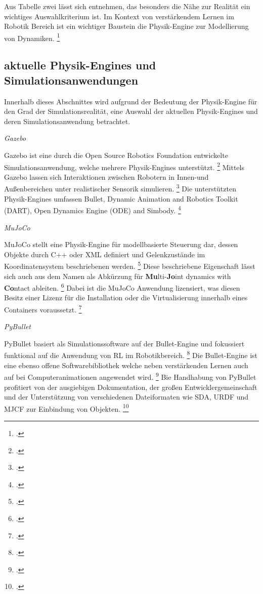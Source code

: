Aus Tabelle zwei lässt sich entnehmen, das besonders die Nähe zur Realität ein wichtiges Auswahlkriterium ist.
Im Kontext von verstärkendem Lernen im Robotik Bereich ist ein wichtiger Baustein die Physik-Engine zur Modellierung von Dynamiken. \footcite[Vgl.][S. 2]{Ayala.2020}

\subsection{aktuelle Physik-Engines und Simulationsanwendungen}
Innerhalb dieses Abschnittes wird aufgrund der Bedeutung der Physik-Engine für den Grad der Simulationsrealität, eine Auswahl der aktuellen Physik-Engines und deren Simulationsanwendung betrachtet.

\textit{Gazebo}

Gazebo ist eine durch die Open Source Robotics Foundation entwickelte Simulationsanwendung, welche mehrere Physik-Engines unterstützt. \footcite[Vgl.][S. 7]{Ivaldi.2272014}
Mittels Gazebo lassen sich Interaktionen zwischen Robotern in Innen-und Außenbereichen unter realistischer Sensorik simulieren. \footcite[Vgl.][S. 4]{Ayala.2020}
Die unterstützten Physik-Engines umfassen Bullet, Dynamic Animation and Robotics Toolkit (DART), Open Dynamics Engine (ODE) and Simbody. \footcite[Vgl.][S. 3]{Korber.2021}

\textit{MuJoCo}

MuJoCo stellt eine Physik-Engine für modellbasierte Steuerung dar, dessen Objekte durch C++ oder XML definiert und Gelenkzustände im Koordinatensystem beschriebenen werden. \footcite[Vgl.][S. 1]{Todorov.2012} 
Diese beschriebene Eigenschaft lässt sich auch aus dem Namen als Abkürzung für \textbf{Mu}lti-\textbf{Jo}int dynamics with \textbf{Co}ntact ableiten. \footcite[Vgl.][S. 2]{Todorov.2012}
Dabei ist die MuJoCo Anwendung lizensiert, was diesen Besitz einer Lizenz für die Installation oder die Virtualisierung innerhalb eines Containers voraussetzt. \footcite[Vgl.][S. 3]{Korber.2021}

\textit{PyBullet}

PyBullet basiert als Simulationssoftware auf der Bullet-Engine und fokussiert funktional auf die Anwendung von RL im Robotikbereich. \footcite[Vgl.][S. 3]{Korber.2021}
Die Bullet-Engine ist eine ebenso offene Softwarebibliothek welche neben verstärkenden Lernen auch auf bei Computeranimationen angewendet wird. \footcite[Vgl.][S. 7]{Ivaldi.2272014}
Bie Handhabung von PyBullet profitiert von der ausgiebigen Dokumentation, der großen Entwicklergemeinschaft und der Unterstützung von verschiedenen Dateiformaten wie SDA, URDF und MJCF zur Einbindung von Objekten. \footcite[Vgl.][S. 6]{Korber.2021}